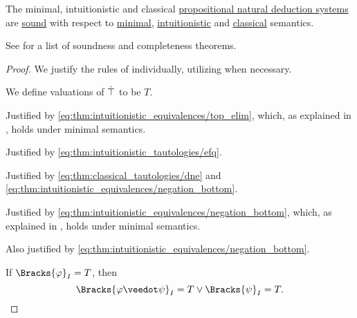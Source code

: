 \begin{theorem}\label{thm:propositional_natural_deduction_soundness}
  The minimal, intuitionistic and classical \hyperref[def:propositional_natural_deduction_systems]{propositional natural deduction systems} are \hyperref[def:logical_framework/soundness]{sound} with respect to \hyperref[def:minimal_propositional_semantics]{minimal}, \hyperref[def:propositional_semantics]{intuitionistic} and \hyperref[def:propositional_semantics]{classical} semantics.
\end{theorem}
\begin{comments}
  \item See  for a list of soundness and completeness theorems.
\end{comments}
\begin{proof}
  We justify the rules of  individually, utilizing  when necessary.

   We define valuations of \( \dot\top \) to be \( T \).

   Justified by \eqref{eq:thm:intuitionistic_equivalences/top_elim}, which, as explained in , holds under minimal semantics.

   Justified by \eqref{eq:thm:intuitionistic_tautologies/efq}.

   Justified by \eqref{eq:thm:classical_tautologies/dne} and \eqref{eq:thm:intuitionistic_equivalences/negation_bottom}.

   Justified by \eqref{eq:thm:intuitionistic_equivalences/negation_bottom}, which, as explained in , holds under minimal semantics.

   Also justified by \eqref{eq:thm:intuitionistic_equivalences/negation_bottom}.

   If \( \Bracks{\varphi}_I = T \), then
  \begin{equation*}
    \Bracks{\varphi \synvee \psi}_I = T \vee \Bracks{\psi}_I = T.
  \end{equation*}


\end{proof}
